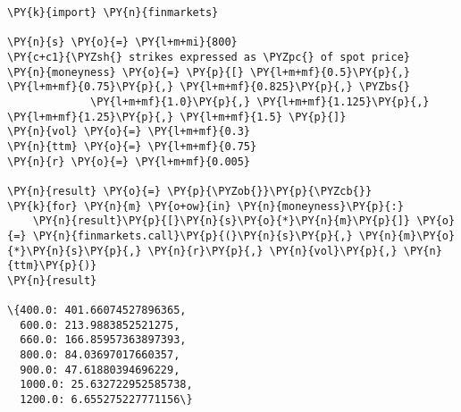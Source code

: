 \begin{Answer}
\begin{tcolorbox}[size=fbox, boxrule=1pt, colback=cellbackground, colframe=cellborder]
\begin{Verbatim}[commandchars=\\\{\}]
\PY{k}{import} \PY{n}{finmarkets}
        
\PY{n}{s} \PY{o}{=} \PY{l+m+mi}{800}
\PY{c+c1}{\PYZsh{} strikes expressed as \PYZpc{} of spot price}
\PY{n}{moneyness} \PY{o}{=} \PY{p}{[} \PY{l+m+mf}{0.5}\PY{p}{,} \PY{l+m+mf}{0.75}\PY{p}{,} \PY{l+m+mf}{0.825}\PY{p}{,} \PYZbs{}
             \PY{l+m+mf}{1.0}\PY{p}{,} \PY{l+m+mf}{1.125}\PY{p}{,} \PY{l+m+mf}{1.25}\PY{p}{,} \PY{l+m+mf}{1.5} \PY{p}{]}
\PY{n}{vol} \PY{o}{=} \PY{l+m+mf}{0.3}
\PY{n}{ttm} \PY{o}{=} \PY{l+m+mf}{0.75}
\PY{n}{r} \PY{o}{=} \PY{l+m+mf}{0.005}

\PY{n}{result} \PY{o}{=} \PY{p}{\PYZob{}}\PY{p}{\PYZcb{}}
\PY{k}{for} \PY{n}{m} \PY{o+ow}{in} \PY{n}{moneyness}\PY{p}{:}
    \PY{n}{result}\PY{p}{[}\PY{n}{s}\PY{o}{*}\PY{n}{m}\PY{p}{]} \PY{o}{=} \PY{n}{finmarkets.call}\PY{p}{(}\PY{n}{s}\PY{p}{,} \PY{n}{m}\PY{o}{*}\PY{n}{s}\PY{p}{,} \PY{n}{r}\PY{p}{,} \PY{n}{vol}\PY{p}{,} \PY{n}{ttm}\PY{p}{)}
\PY{n}{result}

\{400.0: 401.66074527896365,
  600.0: 213.9883852521275,
  660.0: 166.85957363897393,
  800.0: 84.03697017660357,
  900.0: 47.61880394696229,
  1000.0: 25.632722952585738,
  1200.0: 6.655275227771156\}
\end{Verbatim}
\end{tcolorbox}
\end{Answer}

